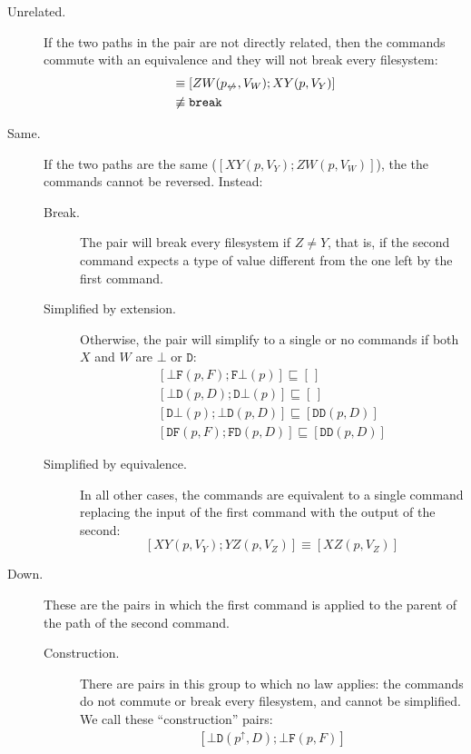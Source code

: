 \documentclass[12pt]{article}
\newcommand{\empt}{\bot}
\newcommand{\pp}{p^\uparrow} %
\newcommand{\np}{p_{\centernot\leftrightarrow}} %
\newcommand{\cbrk}{\mathtt{break}}
\newcommand{\fscommand}[2]{{#1#2}}
\newcommand{\fsregcommandchar}[1]{\mathtt{#1}}
\newcommand{\fsregcommand}[2]{\fscommand{\fsregcommandchar{#1}}{\fsregcommandchar{#2}}}
\newcommand{\cbf}{\fsregcommand{\empt}{F}}
\newcommand{\cbd}{\fsregcommand{\empt}{D}}
\newcommand{\cfb}{\fsregcommand{F}{\empt}}
\newcommand{\cfd}{\fsregcommand{F}{D}}
\newcommand{\cdb}{\fsregcommand{D}{\empt}}
\newcommand{\cdf}{\fsregcommand{D}{F}}
\newcommand{\cdd}{\fsregcommand{D}{D}}
\newcommand{\cxy}{\fscommand{X}{Y}}
\newcommand{\cyz}{\fscommand{Y}{Z}}
\newcommand{\cxz}{\fscommand{X}{Z}}
\newcommand{\czw}{\fscommand{Z}{W}}
\newcommand{\eqext}{\sqsubseteq}
\newcommand{\nequiv}{\not\equiv}
\newcommand{\emptyseq}{[\,]}
\theoremstyle{definition}
\begin{document}
\begin{description}
\item[Unrelated.] If the two paths in the pair are not directly related, then
the commands commute with an equivalence and they will not break every filesystem:
\begin{align*}
[\cxy(p,V_Y); \czw(\np,V_W)] &\equiv [\czw(\np,V_W); \cxy(p,V_Y)] \\
&\nequiv \cbrk
\end{align*}
%
\item[Same.] If the two paths are the same ($[\cxy(p,V_Y); \czw(p,V_W)]$), the
the commands cannot be reversed. Instead:
   \begin{description}
   \item[Break.]
   The pair will break every filesystem if $Z\ne Y$, that is, if the second
   command expects a type of value different from the one left by the first command.
   \item[Simplified by extension.]
   Otherwise, the pair will simplify to a single or no commands
   if both $X$ and $W$ are $\fsregcommandchar{\empt}$ or $\fsregcommandchar{D}$:
   \begin{gather*}
            [\cbf(p, F); \cfb(p)] \eqext \emptyseq \\
            [\cbd(p, D); \cdb(p)] \eqext \emptyseq \\
            [\cdb(p); \cbd(p, D)] \eqext [\cdd(p, D)] \\
            [\cdf(p, F); \cfd(p, D)] \eqext [\cdd(p, D)]
   \end{gather*}
   \item[Simplified by equivalence.]
   In all other cases, the commands are equivalent to a single command
   replacing the input of the first command with the output of the second:
   \[ [\cxy(p, V_Y); \cyz(p, V_Z)] \equiv [\cxz(p, V_Z)] \]
   \end{description}
%
\item[Down.]
These are the pairs in which the first command is applied to the parent of the path
of the second command.
   \begin{description}
   \item[Construction.] There are pairs in this group to which no law applies:
   the commands do not commute or break every filesystem, and cannot be simplified.
   We call these ``construction'' pairs:
   \begin{gather*}
            [\cbd(\pp, D); \cbf(p, F)] \\

\end{gather*}
\end{description}
\end{description}
\end{document}
